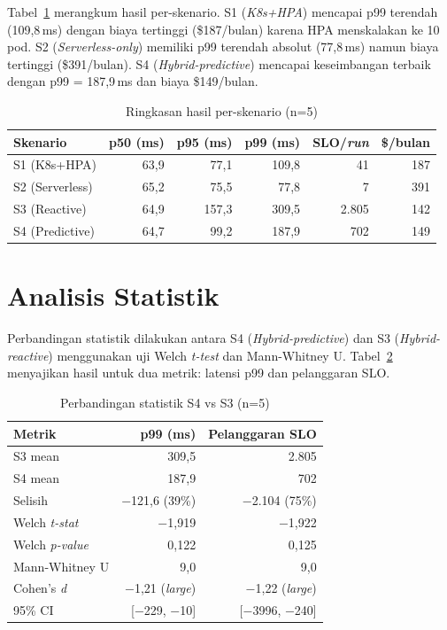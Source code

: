 Tabel~\ref{tab:scenario-summary} merangkum hasil per-skenario. S1 (\emph{K8s+HPA}) mencapai p99 terendah (109,8\,ms) dengan biaya tertinggi (\$187/bulan) karena HPA menskalakan ke 10 pod. S2 (\emph{Serverless-only}) memiliki p99 terendah absolut (77,8\,ms) namun biaya tertinggi (\$391/bulan). S4 (\emph{Hybrid-predictive}) mencapai keseimbangan terbaik dengan p99 = 187,9\,ms dan biaya \$149/bulan.

\begin{table}[htbp]
    \centering
    \caption{Ringkasan hasil per-skenario (n=5)}
    \label{tab:scenario-summary}
    \begin{tabular}{lrrrrr}
        \toprule
        Skenario & p50 (ms) & p95 (ms) & p99 (ms) & SLO/\emph{run} & \$/bulan \\
        \midrule
        S1 (K8s+HPA) & 63,9 & 77,1 & 109,8 & 41 & 187 \\
        S2 (Serverless) & 65,2 & 75,5 & 77,8 & 7 & 391 \\
        S3 (Reactive) & 64,9 & 157,3 & 309,5 & 2.805 & 142 \\
        S4 (Predictive) & 64,7 & 99,2 & 187,9 & 702 & 149 \\
        \bottomrule
    \end{tabular}
\end{table}

\section{Analisis Statistik}
\label{sec:statistical-analysis}

Perbandingan statistik dilakukan antara S4 (\emph{Hybrid-predictive}) dan S3 (\emph{Hybrid-reactive}) menggunakan uji Welch \emph{t-test} dan Mann-Whitney U. Tabel~\ref{tab:statistical-comparison} menyajikan hasil untuk dua metrik: latensi p99 dan pelanggaran SLO.

\begin{table}[htbp]
    \centering
    \caption{Perbandingan statistik S4 vs S3 (n=5)}
    \label{tab:statistical-comparison}
    \begin{tabular}{lrr}
        \toprule
        Metrik & p99 (ms) & Pelanggaran SLO \\
        \midrule
        S3 mean & 309,5 & 2.805 \\
        S4 mean & 187,9 & 702 \\
        Selisih & $-$121,6 (39\%) & $-$2.104 (75\%) \\
        Welch \emph{t-stat} & $-$1,919 & $-$1,922 \\
        Welch \emph{p-value} & 0,122 & 0,125 \\
        Mann-Whitney U & 9,0 & 9,0 \\
        Cohen's \emph{d} & $-$1,21 (\emph{large}) & $-$1,22 (\emph{large}) \\
        95\% CI & [$-$229, $-$10] & [$-$3996, $-$240] \\
        \bottomrule
    \end{tabular}
\end{table}

